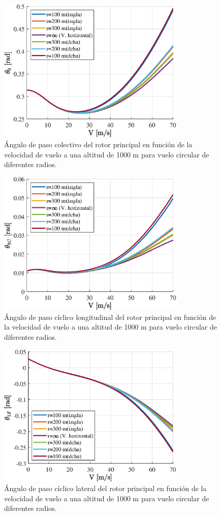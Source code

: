 \begin{figure}
	\centering
	\includegraphics[width=90mm]{graficos/theta0VCcs}
	\caption{Ángulo de paso colectivo del rotor principal en función de la velocidad de vuelo a una altitud de 1000 m para vuelo circular de diferentes radios.}
	\label{theta0VCcs}
\end{figure}
\begin{figure}
	\centering
	\includegraphics[width=90mm]{graficos/theta1CVCcs}
	\caption{Ángulo de paso cíclico longitudinal del rotor principal en función de la velocidad de vuelo a una altitud de 1000 m para vuelo circular de diferentes radios.}
	\label{theta1CVCcs}
\end{figure}
\begin{figure}
	\centering
	\includegraphics[width=90mm]{graficos/theta1SVCcs}
	\caption{Ángulo de paso cíclico lateral del rotor principal en función de la velocidad de vuelo a una altitud de 1000 m para vuelo circular de diferentes radios.}
	\label{theta1SVCcs}
\end{figure}

